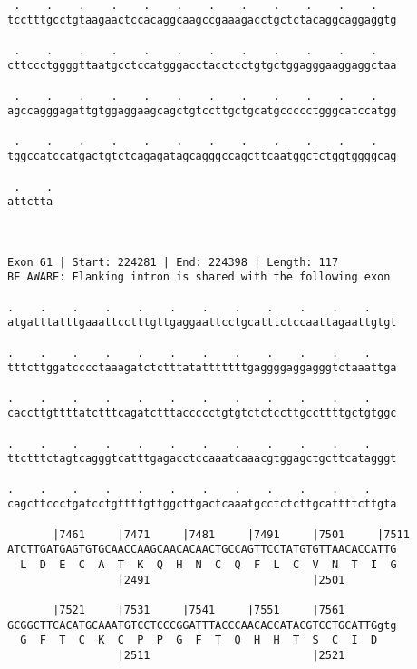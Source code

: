 \documentclass{article}
\begin{document}
\begin{Verbatim}
  
 .    .    .    .    .    .    .    .    .    .    .    .   
tcctttgcctgtaagaactccacaggcaagccgaaagacctgctctacaggcaggaggtg
                                                            
 .    .    .    .    .    .    .    .    .    .    .    .   
cttccctggggttaatgcctccatgggacctacctcctgtgctggagggaaggaggctaa
                                                            
 .    .    .    .    .    .    .    .    .    .    .    .   
agccagggagattgtggaggaagcagctgtccttgctgcatgccccctgggcatccatgg
                                                            
 .    .    .    .    .    .    .    .    .    .    .    .   
tggccatccatgactgtctcagagatagcagggccagcttcaatggctctggtggggcag
                                                            
 .    .
attctta
       
       
 
Exon 61 | Start: 224281 | End: 224398 | Length: 117
BE AWARE: Flanking intron is shared with the following exon
 
.    .    .    .    .    .    .    .    .    .    .    .    
atgatttatttgaaattcctttgttgaggaattcctgcatttctccaattagaattgtgt
                                                            
.    .    .    .    .    .    .    .    .    .    .    .    
tttcttggatcccctaaagatctctttatatttttttgaggggaggagggtctaaattga
                                                            
.    .    .    .    .    .    .    .    .    .    .    .    
caccttgttttatctttcagatctttaccccctgtgtctctccttgccttttgctgtggc
                                                            
.    .    .    .    .    .    .    .    .    .    .    .    
ttctttctagtcagggtcatttgagacctccaaatcaaacgtggagctgcttcatagggt
                                                            
.    .    .    .    .    .    .    .    .    .    .    .    
cagcttccctgatcctgttttgttggcttgactcaaatgcctctcttgcattttcttgta
                                                            
       |7461     |7471     |7481     |7491     |7501     |7511
ATCTTGATGAGTGTGCAACCAAGCAACACAACTGCCAGTTCCTATGTGTTAACACCATTG
  L  D  E  C  A  T  K  Q  H  N  C  Q  F  L  C  V  N  T  I  G
                 |2491                         |2501        
  
       |7521     |7531     |7541     |7551     |7561        
GCGGCTTCACATGCAAATGTCCTCCCGGATTTACCCAACACCATACGTCCTGCATTGgtg
  G  F  T  C  K  C  P  P  G  F  T  Q  H  H  T  S  C  I  D   
                 |2511                         |2521        
  

\end{Verbatim}
\end{document}
